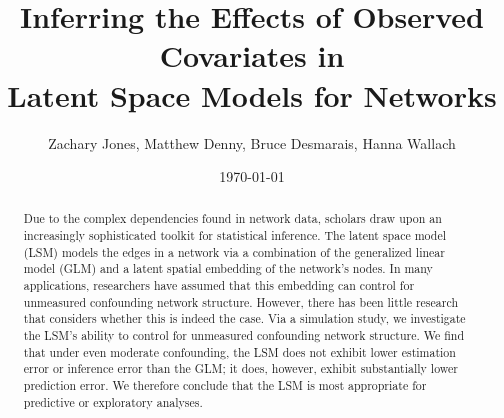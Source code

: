 \documentclass[11pt]{article}
\title{Inferring the Effects of Observed Covariates in\\ Latent Space
  Models for Networks}
\author{Zachary Jones, Matthew Denny, Bruce Desmarais, Hanna Wallach}
\date{\today}
\begin{document}
\singlespacing
\maketitle

\thispagestyle{empty}


\begin{abstract}
  \noindent Due to the complex dependencies found in network data,
  scholars draw upon an increasingly sophisticated toolkit for
  statistical inference. The latent space model (LSM) models the edges
  in a network via a combination of the generalized linear model (GLM)
  and a latent spatial embedding of the network's nodes. In many
  applications, researchers have assumed that this embedding can
  control for unmeasured confounding network structure. However, there
  has been little research that considers whether this is indeed the
  case. Via a simulation study, we investigate the LSM's ability to
  control for unmeasured confounding network structure. We find that
  under even moderate confounding, the LSM does not exhibit lower
  estimation error or inference error than the GLM; it does, however,
  exhibit substantially lower prediction error. We therefore conclude
  that the LSM is most appropriate for predictive or exploratory
  analyses.
\end{abstract}










\end{document}

